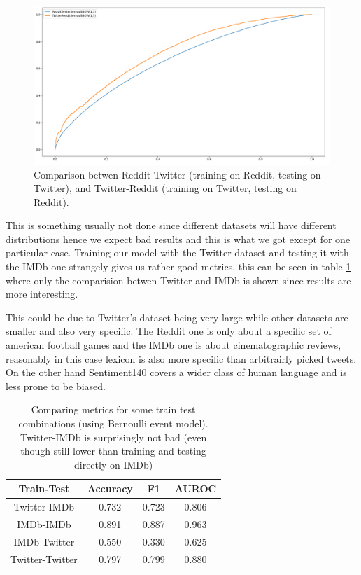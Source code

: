 \documentclass{article}
\begin{document}
    \begin{figure}[h!t]
        \centering
        \includegraphics[scale=0.3]{../experiments/plots/RedditTwitter}
        \caption{Comparison betwen Reddit-Twitter (training on Reddit, testing on Twitter), and Twitter-Reddit (training on Twitter, testing on Reddit).}
        \label{fig:TwitterReddit}
    \end{figure}
    
    This is something usually not done since different datasets will have different distributions hence we expect bad results and this is what we got except for one particular case.
    Training our model with the Twitter dataset and testing it with the IMDb one strangely gives us rather good metrics, this can be seen in table \ref{tab:versus_metrics} where only the comparision betwen Twitter and IMDb is shown since results are more interesting. 
    
    This could be due to Twitter's dataset being very large while other datasets are smaller and also very specific.
    The Reddit one is only about a specific set of american football games and the IMDb one is about cinematographic reviews, reasonably in this case lexicon is also more specific than arbitrairly picked tweets.
    On the other hand Sentiment140 covers a wider class of human language and is less prone to be biased.
    
    
    \begin{table}[h!t]
        \centering
        \caption{Comparing metrics for some train test combinations (using Bernoulli event model). Twitter-IMDb is surprisingly not bad (even though still lower than training and testing directly on IMDb)}
        \label{tab:versus_metrics}
        \begin{tabular}{c|ccc}
            \hline
            Train-Test & Accuracy & F1 & AUROC \\
            \hline 
            Twitter-IMDb & 0.732 & 0.723 & 0.806 \\ 
            IMDb-IMDb & 0.891 & 0.887 & 0.963 \\ 
            IMDb-Twitter & 0.550 & 0.330 & 0.625 \\ 
            Twitter-Twitter & 0.797 & 0.799 & 0.880 \\ 
            \hline
        \end{tabular}
    \end{table}
    
\end{document}

